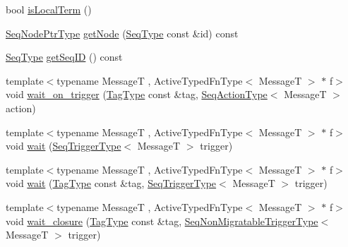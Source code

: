\begin{DoxyCompactItemize}
\item 
bool \hyperlink{structvt_1_1seq_1_1_tagged_sequencer_a73854cf66eef3d55c5ecaa9fc21ec8a2}{is\+Local\+Term} ()
\item 
\hyperlink{namespacevt_1_1seq_ae6a4874b585be0612aaca32ca6d2d191}{Seq\+Node\+Ptr\+Type} \hyperlink{structvt_1_1seq_1_1_tagged_sequencer_a2a36e25799dc4c98b93002536f003c01}{get\+Node} (\hyperlink{structvt_1_1seq_1_1_tagged_sequencer_a1c8ee839258d0f88c49ef660267a81d5}{Seq\+Type} const \&id) const
\item 
\hyperlink{structvt_1_1seq_1_1_tagged_sequencer_a1c8ee839258d0f88c49ef660267a81d5}{Seq\+Type} \hyperlink{structvt_1_1seq_1_1_tagged_sequencer_a47eb9c68e4f21a4eb53dce74ca2f9d49}{get\+Seq\+ID} () const
\item 
{\footnotesize template$<$typename MessageT , Active\+Typed\+Fn\+Type$<$ Message\+T $>$ $\ast$ f$>$ }\\void \hyperlink{structvt_1_1seq_1_1_tagged_sequencer_a7d2d5815ae147f286006419aa3180020}{wait\+\_\+on\+\_\+trigger} (\hyperlink{namespacevt_a84ab281dae04a52a4b243d6bf62d0e52}{Tag\+Type} const \&tag, \hyperlink{structvt_1_1seq_1_1_tagged_sequencer_a0210dbd34288d440e0cd51db9d6637bd}{Seq\+Action\+Type}$<$ MessageT $>$ action)
\item 
{\footnotesize template$<$typename MessageT , Active\+Typed\+Fn\+Type$<$ Message\+T $>$ $\ast$ f$>$ }\\void \hyperlink{structvt_1_1seq_1_1_tagged_sequencer_a9a1be66a0b4667009824bbfbf9a5f7d1}{wait} (\hyperlink{structvt_1_1seq_1_1_tagged_sequencer_a4b015f2f7d3197a66af5576f0e63a834}{Seq\+Trigger\+Type}$<$ MessageT $>$ trigger)
\item 
{\footnotesize template$<$typename MessageT , Active\+Typed\+Fn\+Type$<$ Message\+T $>$ $\ast$ f$>$ }\\void \hyperlink{structvt_1_1seq_1_1_tagged_sequencer_a8c96cc7cc925cfd95b0e90d5e29b2211}{wait} (\hyperlink{namespacevt_a84ab281dae04a52a4b243d6bf62d0e52}{Tag\+Type} const \&tag, \hyperlink{structvt_1_1seq_1_1_tagged_sequencer_a4b015f2f7d3197a66af5576f0e63a834}{Seq\+Trigger\+Type}$<$ MessageT $>$ trigger)
\item 
{\footnotesize template$<$typename MessageT , Active\+Typed\+Fn\+Type$<$ Message\+T $>$ $\ast$ f$>$ }\\void \hyperlink{structvt_1_1seq_1_1_tagged_sequencer_a54b83e9239a17a4fd75f8c2c9ac59cee}{wait\+\_\+closure} (\hyperlink{namespacevt_a84ab281dae04a52a4b243d6bf62d0e52}{Tag\+Type} const \&tag, \hyperlink{namespacevt_1_1seq_aa88b0d93284d188be39704024ab58b8f}{Seq\+Non\+Migratable\+Trigger\+Type}$<$ MessageT $>$ trigger)

\end{DoxyCompactItemize}
